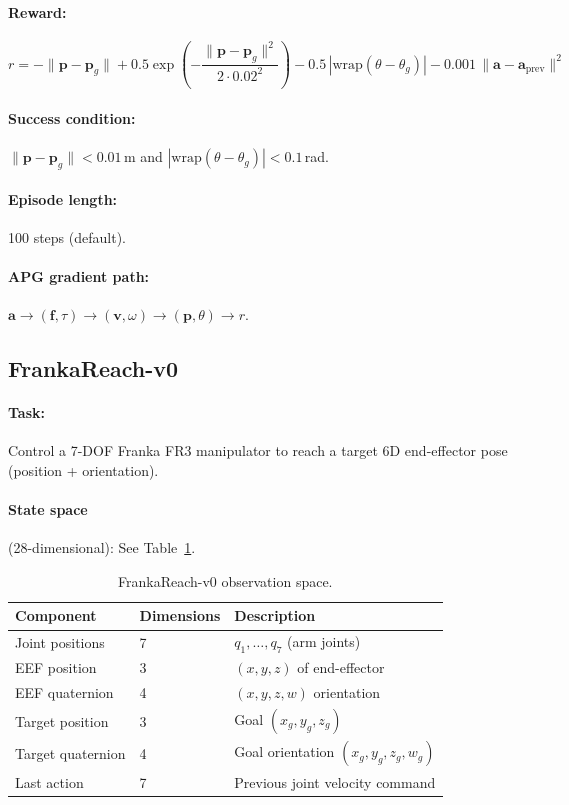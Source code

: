 \documentclass[11pt,a4paper]{article}
\newcommand{\bvf}{\mathbf{v}}
\newcommand{\bpf}{\mathbf{p}}
\newcommand{\bff}{\mathbf{f}}
\newcommand{\ba}{\mathbf{a}}
\begin{document}
\paragraph{Reward:}
\begin{equation}
  r = -\|\bpf - \bpf_g\| + 0.5\exp\!\left(-\frac{\|\bpf - \bpf_g\|^2}{2 \cdot 0.02^2}\right) - 0.5\,|\text{wrap}(\theta - \theta_g)| - 0.001\,\|\ba - \ba_{\text{prev}}\|^2
  \label{eq:pt_reward}
\end{equation}

\paragraph{Success condition:} $\|\bpf - \bpf_g\| < 0.01$\,m and $|\text{wrap}(\theta - \theta_g)| < 0.1$\,rad.

\paragraph{Episode length:} 100 steps (default).

\paragraph{APG gradient path:} $\ba \rightarrow (\bff, \tau) \rightarrow (\bvf, \omega) \rightarrow (\bpf, \theta) \rightarrow r$.

\subsection{FrankaReach-v0}
\label{sec:env_franka}

\paragraph{Task:} Control a 7-DOF Franka FR3 manipulator to reach a target 6D end-effector pose (position + orientation).

\paragraph{State space} (28-dimensional): See Table~\ref{tab:fr_obs}.

\begin{table}[htbp]
  \centering
  \caption{FrankaReach-v0 observation space.}
  \label{tab:fr_obs}
  \begin{tabular}{@{}lll@{}}
    \toprule
    \textbf{Component} & \textbf{Dimensions} & \textbf{Description} \\
    \midrule
    Joint positions     & 7 & $q_1, \ldots, q_7$ (arm joints) \\
    EEF position        & 3 & $(x, y, z)$ of end-effector \\
    EEF quaternion      & 4 & $(x, y, z, w)$ orientation \\
    Target position     & 3 & Goal $(x_g, y_g, z_g)$ \\
    Target quaternion   & 4 & Goal orientation $(x_g, y_g, z_g, w_g)$ \\
    Last action         & 7 & Previous joint velocity command \\
    \bottomrule
  \end{tabular}
\end{table}
\end{document}
